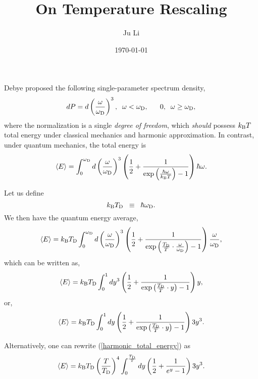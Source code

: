 \documentclass[12pt]{article}
\title{On Temperature Rescaling}
\date{\today}
\author{Ju Li}
\begin{document}
\maketitle

Debye proposed the following single-parameter spectrum density,
\begin{equation}
dP = d\left (\frac{\omega}{\omega_{\rm D}} \right)^3, 
\;\;\omega < \omega_{\rm D}, \;\;\;\;\;\;0,\;\;\omega \ge \omega_{\rm
D}, \label{Debye_DOS}
\end{equation}
where the normalization is a single {\em degree of freedom}, which
{\em should} possess $k_{\rm B}T$ total energy under classical
mechanics and harmonic approximation. In contrast, under quantum
mechanics, the total energy is
\begin{equation}
\langle E \rangle = \int_0^{\omega_{\rm D}} 
d\left (\frac{\omega}{\omega_{\rm D}} \right)^3
\left ( \frac{1}{2} + 
\frac{1}{\exp\left ( \frac{\hbar\omega}{k_{\rm B}T} \right ) - 1} \right )
\hbar \omega. 
\end{equation}

Let us define
\begin{equation}
k_{\rm B}T_{\rm D} \;\;\equiv\;\; \hbar \omega_{\rm D}.
\end{equation}
We then have the quantum energy average,
\begin{equation}
\langle E \rangle = k_{\rm B} T_{\rm D}
\int_0^{\omega_{\rm D}}
d\left (\frac{\omega}{\omega_{\rm D}} \right)^3
\left ( \frac{1}{2} + \frac{1}{\exp\left ( 
\frac{T_{\rm D}}{T}\cdot \frac{\omega}{\omega_{\rm D}} 
\right ) - 1} \right )
\frac{\omega}{\omega_{\rm D}},
\end{equation}
which can be written as,
\begin{equation}
\langle E \rangle = k_{\rm B} T_{\rm D} \int_0^1
dy^3 \left ( \frac{1}{2} + 
\frac{1}{\exp\left ( \frac{T_{\rm D}}{T}\cdot y \right ) - 1} 
\right ) y,
\end{equation}
or,
\begin{equation}
\langle E \rangle = k_{\rm B} T_{\rm D} \int_0^1
dy \left ( \frac{1}{2} + 
\frac{1}{\exp\left ( \frac{T_{\rm D}}{T}\cdot y \right ) - 1} \right ) 
3y^3.
\label{harmonic_total_energy}
\end{equation}

Alternatively, one can rewrite (\ref{harmonic_total_energy}) as
\begin{equation}
\langle E \rangle = k_{\rm B} T_{\rm D} 
\left ( \frac{T}{T_{\rm D}} \right )^4
\int_0^{\frac{T_{\rm D}}{T}}
dy \left ( \frac{1}{2} +
\frac{1}{e^y - 1} \right ) 3y^3.
\end{equation}
\end{document}
